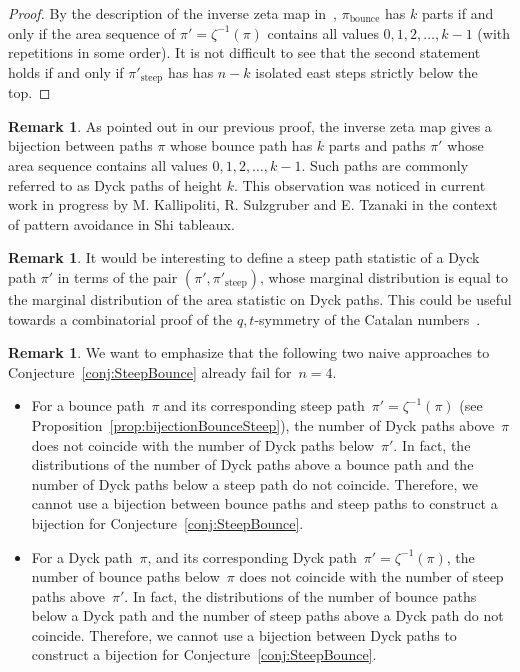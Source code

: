 \documentclass{amsart}
\theoremstyle{definition}
\newtheorem{remark}[theorem]{Remark}
\newcommand{\bounce}{\operatorname{bounce}} %
\newcommand{\steep}{\operatorname{steep}} %
\begin{document}
\begin{proof}
By the description of the inverse zeta map in~\cite[Proof of Theorem~3.15]{Haglund-qt-catalan}, 
$\pi_{\bounce}$ has $k$ parts if and only if the area sequence of $\pi'=\zeta^{-1}(\pi)$ contains all values $0,1,2,\dots, k-1$ (with repetitions in some order). 
It is not difficult to see that the second statement holds if and only if $\pi'_{\steep}$ has has $n-k$ isolated east steps strictly below the top.
\end{proof}

\begin{remark}
\label{rem_bouncek_heightk}
As pointed out in our previous proof, the inverse zeta map gives a bijection between paths $\pi$ whose bounce path has $k$ parts and paths $\pi'$ whose area sequence contains all values $0,1,2,\dots, k-1$. Such paths are commonly referred to as Dyck paths of height $k$.
This observation was noticed in current work in progress by M. Kallipoliti, R. Sulzgruber and E. Tzanaki in the context of pattern avoidance in Shi tableaux.
\end{remark}

\begin{remark}
It would be interesting to define a steep path statistic of a Dyck path $\pi'$ in terms of the pair $(\pi',\pi'_{\steep})$, whose marginal distribution is equal to the marginal distribution of the area statistic on Dyck paths. This could be useful towards a combinatorial proof of the $q,t$-symmetry of the Catalan numbers~\cite[Open~Problem~3.11]{Haglund-qt-catalan}.
\end{remark}

\begin{remark}
We want to emphasize that the following two naive approaches to Conjecture~\ref{conj:SteepBounce} already fail for~$n = 4$.
\begin{itemize}
\item For a bounce path~$\pi$ and its corresponding steep path~$\pi' = \zeta^{-1}(\pi)$ (see Proposition~\ref{prop:bijectionBounceSteep}), the number of Dyck paths above~$\pi$ does not coincide with the number of Dyck paths below~$\pi'$. In fact, the distributions of the number of Dyck paths above a bounce path and the number of Dyck paths below a steep path do not coincide. Therefore, we cannot use a bijection between bounce paths and steep paths to construct a bijection for Conjecture~\ref{conj:SteepBounce}.
\item For a Dyck path~$\pi$, and its corresponding Dyck path~$\pi' = \zeta^{-1}(\pi)$, the number of bounce paths below~$\pi$ does not coincide with the number of steep paths above~$\pi'$. In fact, the distributions of the number of bounce paths below a Dyck path and the number of steep paths above a Dyck path do not coincide. Therefore, we cannot use a bijection between Dyck paths to construct a bijection for Conjecture~\ref{conj:SteepBounce}.
\end{itemize}
\end{remark}
\end{document}
